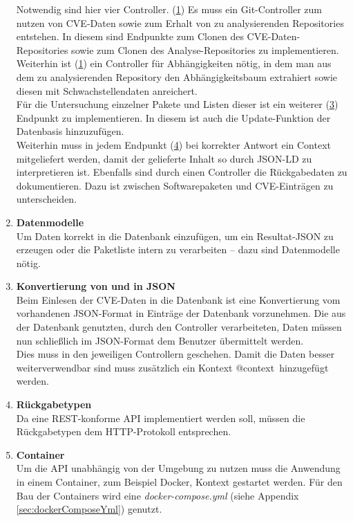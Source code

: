 \begin{enumerate}
            Notwendig sind hier vier Controller.
            (\hyperref[api_controller:one]{1}) Es muss ein Git-Controller zum nutzen von \ac{CVE}-Daten sowie zum Erhalt von zu analysierenden Repositories entstehen.
            In diesem sind Endpunkte zum Clonen des \ac{CVE}-Daten-Repositories sowie zum Clonen des Analyse-Repositories zu implementieren. %
            \\
            Weiterhin ist (\hyperref[api_controller:two]{1}) ein Controller für Abhängigkeiten nötig, in dem man aus dem zu analysierenden Repository den Abhängigkeitsbaum extrahiert sowie diesen mit Schwachstellendaten anreichert.
            \\
            Für die Untersuchung einzelner Pakete und Listen dieser ist ein weiterer (\hyperref[api_controller:three]{3}) Endpunkt zu implementieren.
            In diesem ist auch die Update-Funktion der Datenbasis hinzuzufügen.
            \\
            Weiterhin muss in jedem Endpunkt (\hyperref[api_controller:four]{4}) bei korrekter Antwort ein Context mitgeliefert werden, damit der gelieferte Inhalt so durch \ac{JSON-LD} zu interpretieren ist.
            Ebenfalls sind durch einen Controller die Rückgabedaten zu dokumentieren.
            Dazu ist zwischen Softwarepaketen und \ac{CVE}-Einträgen zu unterscheiden.
        \item \textbf{Datenmodelle} \label{arch_4}\\
            Um Daten korrekt in die Datenbank einzufügen, um ein Resultat-\ac{JSON} zu erzeugen oder die Paketliste intern zu verarbeiten -- dazu sind Datenmodelle nötig.
        \item \textbf{Konvertierung von und in JSON} \label{arch_5}\\
            Beim Einlesen der \ac{CVE}-Daten in die Datenbank ist eine Konvertierung vom vorhandenen \ac{JSON}-Format in Einträge der Datenbank vorzunehmen.
            Die aus der Datenbank genutzten, durch den Controller verarbeiteten, Daten müssen nun schließlich im \ac{JSON}-Format dem Benutzer übermittelt werden.
            \\
            Dies muss in den jeweiligen Controllern geschehen.
            Damit die Daten besser weiterverwendbar sind muss zusätzlich ein Kontext \glqq @context\grqq~hinzugefügt werden.
        \item \textbf{Rückgabetypen} \label{arch_5_1}\\
            Da eine REST-konforme \ac{API} implementiert werden soll, müssen die Rückgabetypen dem HTTP-Protokoll entsprechen.
        \item \textbf{Container} \\
            Um die \ac{API} unabhängig von der Umgebung zu nutzen muss die Anwendung in einem Container, zum Beispiel Docker, Kontext gestartet werden.
            Für den Bau der Containers wird eine \textit{docker-compose.yml} (siehe Appendix \ref{sec:dockerComposeYml}) genutzt.
    \end{enumerate}
